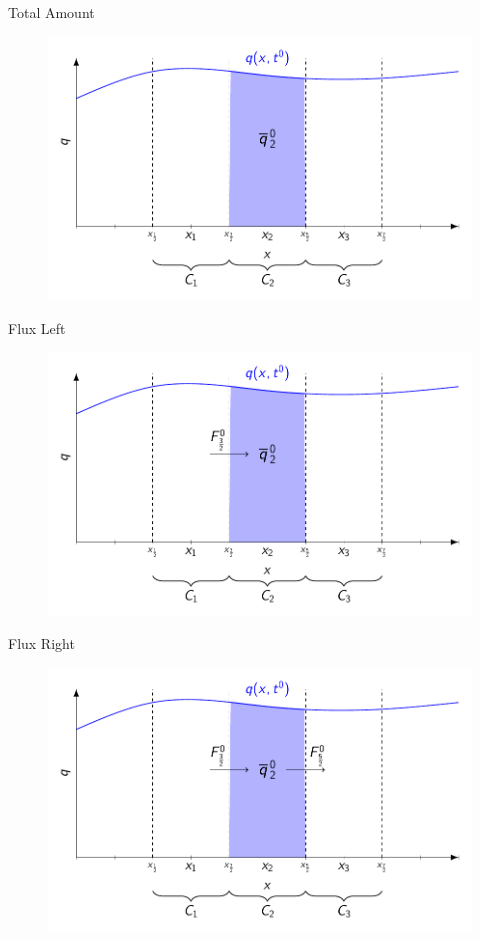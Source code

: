 \documentclass[]{beamer}
\begin{document}
\begin{frame}{Total Amount}
	\begin{figure}
		\includegraphics[width=\textwidth]{./Pics/FVMpicture/Total.pdf}
	\end{figure}
\end{frame}
\begin{frame}{Flux Left}
	\begin{figure}
		\includegraphics[width=\textwidth]{./Pics/FVMpicture/TotalFluxIn.pdf}
	\end{figure}
\end{frame}
\begin{frame}{Flux Right}
	\begin{figure}
		\includegraphics[width=\textwidth]{./Pics/FVMpicture/TotalFluxInOut.pdf}
	\end{figure}
\end{frame}
\end{document}
